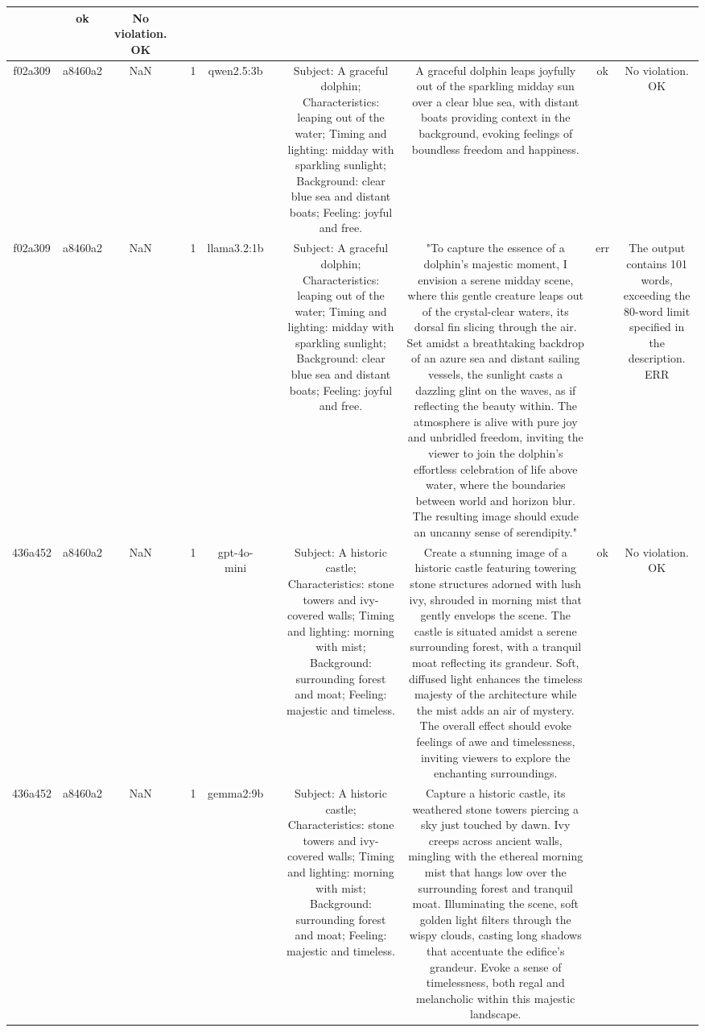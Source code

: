 \begin{table}[h!]
\begin{tabular}{|c|c|c|c|c|c|c|c|c|c|c|}
 & ok & No violation.
OK\\
\hline
f02a309 & a8460a2 & NaN &  & 1 & qwen2.5:3b &  & Subject: A graceful dolphin; Characteristics: leaping out of the water; Timing and lighting: midday with sparkling sunlight; Background: clear blue sea and distant boats; Feeling: joyful and free. & A graceful dolphin leaps joyfully out of the sparkling midday sun over a clear blue sea, with distant boats providing context in the background, evoking feelings of boundless freedom and happiness. & ok & No violation.
OK\\
\hline
f02a309 & a8460a2 & NaN &  & 1 & llama3.2:1b &  & Subject: A graceful dolphin; Characteristics: leaping out of the water; Timing and lighting: midday with sparkling sunlight; Background: clear blue sea and distant boats; Feeling: joyful and free. & "To capture the essence of a dolphin's majestic moment, I envision a serene midday scene, where this gentle creature leaps out of the crystal-clear waters, its dorsal fin slicing through the air. Set amidst a breathtaking backdrop of an azure sea and distant sailing vessels, the sunlight casts a dazzling glint on the waves, as if reflecting the beauty within. The atmosphere is alive with pure joy and unbridled freedom, inviting the viewer to join the dolphin's effortless celebration of life above water, where the boundaries between world and horizon blur. The resulting image should exude an uncanny sense of serendipity." & err & The output contains 101 words, exceeding the 80-word limit specified in the description.
ERR\\
\hline
436a452 & a8460a2 & NaN &  & 1 & gpt-4o-mini &  & Subject: A historic castle; Characteristics: stone towers and ivy-covered walls; Timing and lighting: morning with mist; Background: surrounding forest and moat; Feeling: majestic and timeless. & Create a stunning image of a historic castle featuring towering stone structures adorned with lush ivy, shrouded in morning mist that gently envelops the scene. The castle is situated amidst a serene surrounding forest, with a tranquil moat reflecting its grandeur. Soft, diffused light enhances the timeless majesty of the architecture while the mist adds an air of mystery. The overall effect should evoke feelings of awe and timelessness, inviting viewers to explore the enchanting surroundings. & ok & No violation.
OK\\
\hline
436a452 & a8460a2 & NaN &  & 1 & gemma2:9b &  & Subject: A historic castle; Characteristics: stone towers and ivy-covered walls; Timing and lighting: morning with mist; Background: surrounding forest and moat; Feeling: majestic and timeless. & Capture a historic castle, its weathered stone towers piercing a sky just touched by dawn.  Ivy creeps across ancient walls, mingling with the ethereal morning mist that hangs low over the surrounding forest and tranquil moat. Illuminating the scene, soft golden light filters through the wispy clouds, casting long shadows that accentuate the edifice's grandeur. Evoke a sense of timelessness, both regal and melancholic within this majestic landscape. 



\end{tabular}
\end{table}
